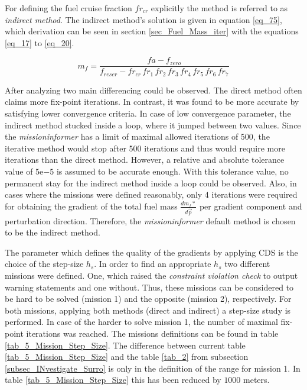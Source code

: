 For defining the fuel cruise fraction 
$fr_{cr}$ explicitly the method is 
referred to as \emph{indirect method}. 
The indirect method's solution  
is given in equation \eqref{eq_75},
which derivation can be seen in section \ref{sec_Fuel_Mass_iter}
with the equations \eqref{eq_17} to \eqref{eq_20}.

\begin{equation}
    \label{eq_75}
    m_{f} = \frac{fa - f_{zero}}{f_{reser} -fr_{cr} 
    \,fr_1 \, fr_2\,fr_3 \, fr_4 \, 
    fr_5\, fr_6\, fr_7 }
\end{equation}

After analyzing two main differencing could be
observed. The direct method often claims 
more fix-point iterations. In contrast, 
it was found to be more accurate 
by satisfying lower convergence criteria. In case 
of low convergence parameter, the 
indirect method stucked inside a loop, where 
it jumped between two values.
Since the \emph{missioninformer} has a limit 
of maximal allowed iterations of 500, 
the iterative method would stop 
after 500 iterations and thus would 
require more iterations than the 
direct method. However, a relative 
and absolute tolerance \cite{noauthor_numpys_2021} value of 
$5 \mathrm{e}{-5}$ is assumed to be accurate enough.
With this tolerance value, no 
permanent stay for the indirect method inside 
a loop could be observed.
Also, in cases where the missions were 
defined reasonably, only 4 iterations 
were required for obtaining the 
gradient of the total fuel mass $\frac{dm_f*}{d\vec{p}}$ 
per gradient component and perturbation 
direction.
Therefore, the \emph{missioninformer} default method 
is chosen to be the indirect method.\newline 

The parameter which defines the quality of 
the gradients by applying CDS is the 
choice of the step-size $h_s$. In order 
to find an appropriate $h_s$ two different 
missions were defined. One, which 
raised the \emph{constraint violation check} 
to output warning statements and 
one without. Thus, these missions can be 
considered to be hard to be solved (mission 1)
and the opposite (mission 2), 
respectively. For both missions, 
applying both methods (direct and indirect)
a step-size study is performed. In case 
of the harder to solve mission 1, the number 
of maximal fix-point iterations was reached. The 
missions definitions can be 
found in table \ref{tab_5_Mission_Step_Size}.
The difference 
between current table \ref{tab_5_Mission_Step_Size}
and the table \ref{tab_2} from subsection 
\ref{subsec_INvestigate_Surro} is only 
in the definition of the range for mission 1.
In table 
\ref{tab_5_Mission_Step_Size} this has been 
reduced by $1000$ meters.

